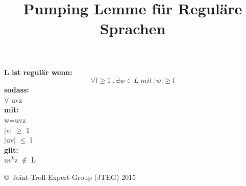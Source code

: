 \documentclass{article}
\title{Pumping Lemme f\"ur Regul\"are Sprachen}
\date{ }
\newcommand{\xhspace}[0]{\noindent\hspace*{5mm}}
\begin{document}
	\maketitle
	\textbf{L ist regul\"ar wenn:}
		\[		
			\forall l \geq 1\;.\, \exists w \in L\;mit\; |w|\geq l
		\]
	\textbf{sodass:}\\
		\xhspace	$\forall$ uvz \\
	\textbf{mit:}\\ 
		\xhspace	w=uvz\\
		\xhspace	$|$v$|$ $\geq$ 1\\
		\xhspace	$|$uv$|$ $\leq$ l\\
	\textbf{gilt:}\\
		\xhspace	u$v^{k}$z $\notin$ L 

	\begin{tiny}
	\copyright\ Joint-Troll-Expert-Group (JTEG) 2015
	\end{tiny}
\end{document}
